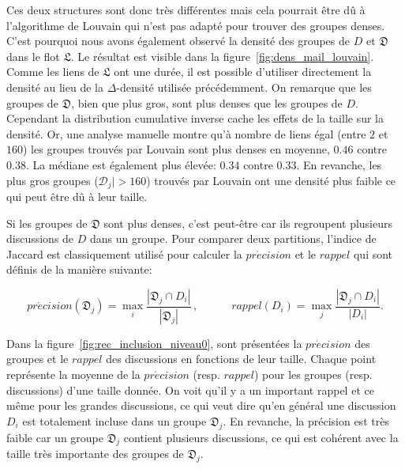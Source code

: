 Ces deux structures sont donc très différentes mais cela pourrait être dû à l'algorithme de Louvain qui n'est pas adapté pour trouver des groupes denses.
C'est pourquoi nous avons également observé la densité des groupes de $D$ et $\mathfrak{D}$ dans le flot $\mathfrak{L}$.
Le résultat est visible dans la figure~\ref{fig:dens_mail_louvain}.
Comme les liens de $\mathfrak{L}$ ont une durée, il est possible d'utiliser directement la densité au lieu de la $\Delta$-densité utilisée précédemment.
On remarque que les groupes de $\mathfrak{D}$, bien que plus gros, sont plus denses que les groupes de $D$.
Cependant la distribution cumulative inverse cache les effets de la taille sur la densité.
Or, une analyse manuelle montre qu'à nombre de liens égal (entre $2$ et $160$) les groupes trouvés par Louvain sont  plus denses en moyenne, $0.46$ contre $0.38$. 
La médiane est également plus élevée: $0.34$ contre $0.33$.
En revanche, les plus gros groupes ($\mathcal{D}_j|>160$) trouvés par Louvain ont une densité plus faible ce qui peut être dû à leur taille.

Si les groupes de $\mathfrak{D}$ sont plus denses, c'est peut-être car ils regroupent plusieurs discussions de $D$ dans un groupe.
Pour comparer deux partitions, l'indice de Jaccard est classiquement utilisé pour calculer la $pr\acute{e}cision$ et le $rappel$ qui sont définis de la manière suivante:

\begin{equation*}
pr\acute{e}cision(\mathfrak{D}_j)= \max_{i} \frac{|\mathfrak{D}_j \cap D_i|}{|\mathfrak{D}_j|}\,, \quad \qquad
rappel(D_i)= \max_{j} \frac{|\mathfrak{D}_j \cap D_i|}{|D_i|}.
\label{eq:rappel}
\end{equation*}

Dans la figure~\ref{fig:rec_inclusion_niveau0}, sont présentées la $pr\acute{e}cision$  des groupes et le $rappel$ des discussions en fonctions de leur taille.
Chaque point représente la moyenne de la $pr\acute{e}cision$ (resp. $rappel$) pour les groupes (resp. discussions) d'une taille donnée.
On voit qu'il y a un important rappel et ce même pour les grandes discussions, ce qui veut dire qu'en général une discussion $D_i$ est totalement incluse dans un groupe $\mathfrak{D}_j$.
En revanche, la précision est très faible car un groupe $\mathfrak{D}_j$ contient plusieurs discussions, ce qui est cohérent avec la taille très importante des groupes de $\mathfrak{D}_j$.


